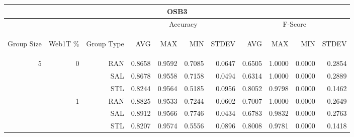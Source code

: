 \begin{center}
\begin{table}[htbp]
\begin{tabular}{ | r | r | r | r | r | r | r | r | r | r | r |}
\hline
\multicolumn{11}{|c|}{OSB3}\\
\hline
 & & & \multicolumn{4}{|c|}{Accuracy} & \multicolumn{4}{|c|}{F-Score}\\ \cline{4-11}
\begin{sideways}Group Size\end{sideways} & \begin{sideways}Web1T \%\end{sideways} & \begin{sideways}Group Type\end{sideways} & \begin{sideways}AVG\end{sideways} & \begin{sideways}MAX\end{sideways} & \begin{sideways}MIN\end{sideways} & \begin{sideways}STDEV\end{sideways} & \begin{sideways}AVG\end{sideways} & \begin{sideways}MAX\end{sideways} & \begin{sideways}MIN\end{sideways} & \begin{sideways}STDEV\end{sideways}\\
\hline
\multirow{18}{*}{5}
 & \multirow{3}{*}{0} & RAN & 0.8658 & 0.9592 & 0.7085 & 0.0647 & 0.6505 & 1.0000 & 0.0000 & 0.2854\\ \cline{3-11}
 &   & SAL & 0.8678 & 0.9558 & 0.7158 & 0.0494 & 0.6314 & 1.0000 & 0.0000 & 0.2889\\ \cline{3-11}
 &   & STL & 0.8244 & 0.9564 & 0.5185 & 0.0956 & 0.8052 & 0.9798 & 0.0000 & 0.1462\\ \cline{2-11}
 & \multirow{3}{*}{1} & RAN & 0.8825 & 0.9533 & 0.7244 & 0.0602 & 0.7007 & 1.0000 & 0.0000 & 0.2649\\ \cline{3-11}
 &   & SAL & 0.8912 & 0.9566 & 0.7746 & 0.0434 & 0.6783 & 0.9832 & 0.0000 & 0.2763\\ \cline{3-11}
 &   & STL & 0.8207 & 0.9574 & 0.5556 & 0.0896 & 0.8008 & 0.9781 & 0.0000 & 0.1418\\ \cline{2-11}

\end{tabular}
\end{table}
\end{center}
